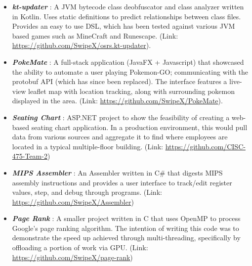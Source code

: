 \documentclass[10pt,a4paper]{altacv}
\begin{document}
\begin{itemize}

\item \textbf{\textit{kt-updater}} : A JVM bytecode class deobfuscator and class analyzer written in Kotlin. Uses static definitions to predict relationships between class files. Provides an easy to use DSL, which has been tested against various JVM based games such as MineCraft and Runescape. (Link: \url{https://github.com/SwipeX/osrs.kt-updater}).

\divider

\item \textbf{\textit{PokeMate}} : A full-stack application (JavaFX + Javascript) that showcased the ability to automate a user playing Pokemon-GO; communicating with the protobuf API (which has since been replaced). The interface features a live-view leaflet map with location tracking, along with surrounding pokemon displayed in the area. (Link: \url{https://github.com/SwipeX/PokeMate}).

\divider

\item \textbf{\textit{Seating Chart}} : ASP.NET project to show the feasibility of creating a web-based seating chart application. In a production environment, this would pull data from various sources and aggregate it to find where employees are located in a typical multiple-floor building. (Link: \url{https://github.com/CISC-475-Team-2})

\divider

\item \textbf{\textit{MIPS Assembler}} : An Assembler written in C\# that digests MIPS assembly instructions and provides a user interface to track/edit register values, step, and debug through programs.
(Link: \url{https://github.com/SwipeX/Assembler})
\divider

\item \textbf{\textit{Page Rank}} : A smaller project written in C that uses OpenMP to process Google's page ranking algorithm. The intention of writing this code was to demonstrate the speed up achieved through multi-threading, specifically by offloading a portion of work via GPU. (Link: \url{https://github.com/SwipeX/page-rank})
\end{itemize}

\clearpage
\end{document}
